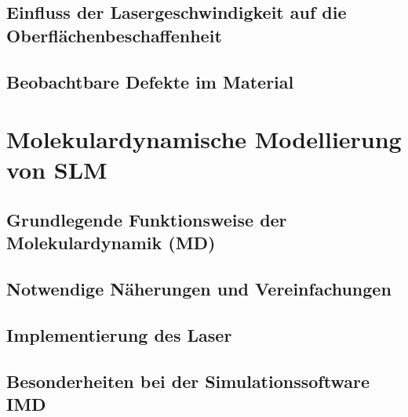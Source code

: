 	\subsection{Einfluss der Lasergeschwindigkeit auf die Oberflächenbeschaffenheit}
	\subsection{Beobachtbare Defekte im Material}


\section{Molekulardynamische Modellierung von SLM}
	\subsection{Grundlegende Funktionsweise der Molekulardynamik (MD)}
	\subsection{Notwendige Näherungen und Vereinfachungen}
	\subsection{Implementierung des Laser}
	\subsection{Besonderheiten bei der Simulationssoftware IMD}
